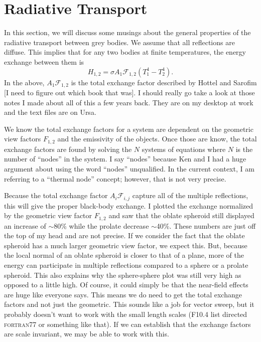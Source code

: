 \section{Radiative Transport}
In this section, we will discuss some musings about the general
properties of the radiative transport between grey bodies.  We assume
that all reflections are diffuse.  This implies that for any two bodies
at finite temperatures, the energy exchange between them is 
\begin{equation}
    H_{1,2} = \sigma A_1\mathcal{F}_{1,2} \left(T_1^4 -T_2^4\right).
\end{equation}
In the above, \(A_1\mathcal{F}_{1,2}\) is the total exchange factor 
described by Hottel and Sarofim [I need to figure out which book that
was].  I should really go take a look at those notes I made about all of
this a few years back.  They are on my desktop at work and the text
files are on Ursa.

We know the total exchange factors for a system are dependent on the
geometric view factors \(F_{1,2}\) and the emissivity of the objects.
Once those are know, the total exchange factors are found by solving the
\(N\) systems of equations where \(N\) is the number of ``nodes'' in the
system.  I say ``nodes'' because Ken and I had a huge argument about
using the word ``nodes'' unqualified.  In the current context, I am
referring to a ``thermal node'' concept; however, that is not very
precise. 

Because the total exchange factor \(A_i\mathcal{F}_{i,j}\) capture all
of the multiple reflections, this will give the proper black-body
exchange.  I plotted the exchange normalized by the geometric view
factor \(F_{1,2}\) and saw that the oblate spheroid still displayed an
increase of \(\sim\)80\% while the prolate decrease \(\sim\)40\%.  These
numbers are just off the top of my head and are not precise.  If we
consider the fact that the oblate spheroid has a much larger geometric
view factor, we expect this.  But, because the local normal of an oblate
spheroid is closer to that of a plane, more of the energy can
participate in multiple reflections compared to a sphere or a prolate
spheroid.  This also explains why the sphere-sphere plot was still very
high as opposed to a little high.  Of course, it could simply be that
the near-field effects are huge like everyone says.  This means we do
need to get the total exchange factors and not just the geometric.  This
sounds like a job for vector sweep, but it probably doesn't want to work
with the small length scales (\textsc{F10.4} list directed
\textsc{fortran77} or something like that).  If we can establish that
the exchange factors are scale invariant, we may be able to work with
this.

